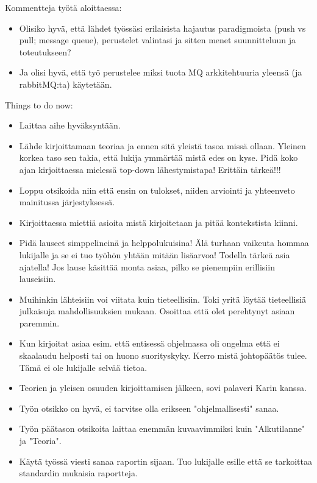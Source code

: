 \begin{it}
	Kommentteja työtä aloittaessa:
	\begin{itemize}
		\item Olisiko hyvä, että lähdet työssäsi erilaisista hajautus paradigmoista (push vs pull; message queue), perustelet valintasi ja sitten menet suunnitteluun ja toteutukseen?
		\item Ja olisi hyvä, että työ perustelee miksi tuota MQ arkkitehtuuria yleensä (ja rabbitMQ:ta) käytetään.
	\end{itemize}
	
	Things to do now:
	\begin{itemize}
		\item Laittaa aihe hyväksyntään.
		\item Lähde kirjoittamaan teoriaa ja ennen sitä yleistä tasoa missä ollaan. Yleinen korkea taso sen takia, että lukija ymmärtää mistä edes on kyse. Pidä koko ajan kirjoittaessa mielessä top-down lähestymistapa! Erittäin tärkeä!!!
		\item Loppu otsikoida niin että ensin on tulokset, niiden arviointi ja yhteenveto mainitussa järjestyksessä.
		\item Kirjoittaessa miettiä asioita mistä kirjoitetaan ja pitää kontekstista kiinni.
		\item Pidä lauseet simppelineinä ja helppolukuisina! Älä turhaan vaikeuta hommaa lukijalle ja se ei tuo työhön yhtään mitään lisäarvoa! Todella tärkeä asia ajatella! Jos lause käsittää monta asiaa, pilko se pienempiin erillisiin lauseisiin.
		\item Muihinkin lähteisiin voi viitata kuin tieteellisiin. Toki yritä löytää tieteellisiä julkaisuja mahdollisuuksien mukaan. Osoittaa että olet perehtynyt asiaan paremmin.
		\item Kun kirjoitat asiaa esim. että entisessä ohjelmassa oli ongelma että ei skaalaudu helposti tai on huono suorityskyky. Kerro mistä johtopäätös tulee. Tämä ei ole lukijalle selvää tietoa.
		\item Teorien ja yleisen osuuden kirjoittamisen jälkeen, sovi palaveri Karin kanssa.
		\item Työn otsikko on hyvä, ei tarvitse olla erikseen "ohjelmallisesti" sanaa.
		\item Työn päätason otsikoita laittaa enemmän kuvaavimmiksi kuin "Alkutilanne" ja "Teoria".
		\item Käytä työssä viesti sanaa raportin sijaan. Tuo lukijalle esille että se tarkoittaa standardin mukaisia raportteja.
	\end{itemize}
\end{it}